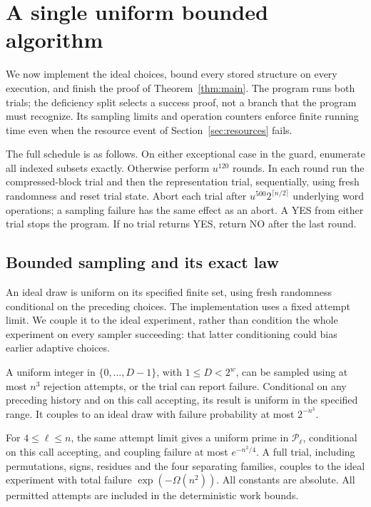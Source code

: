 \section{A single uniform bounded algorithm}
\label{sec:implementation}

We now implement the ideal choices, bound every stored structure on
every execution, and finish the proof of Theorem~\ref{thm:main}.
The program runs both trials; the deficiency split selects a success
proof, not a branch that the program must recognize. Its sampling
limits and operation counters enforce finite running time even when
the resource event of Section~\ref{sec:resources} fails.

The full schedule is as follows. On either exceptional case in the
guard, enumerate all indexed subsets exactly. Otherwise perform
\(u^{120}\) rounds. In each round run the compressed-block trial and
then the representation trial, sequentially, using fresh randomness
and reset trial state. Abort each trial after
\(u^{500}2^{\lceil n/2\rceil}\) underlying word operations; a sampling
failure has the same effect as an abort. A YES from either trial stops
the program. If no trial returns YES, return NO after the last round.

\subsection{Bounded sampling and its exact law}

An ideal draw is uniform on its specified finite set, using fresh
randomness conditional on the preceding choices. The implementation
uses a fixed attempt limit. We couple it to the ideal experiment,
rather than condition the whole experiment on every sampler succeeding:
that latter conditioning could bias earlier adaptive choices.

\begin{lemma}\label{lem:samplers}
A uniform integer in \(\{0,\ldots,D-1\}\), with \(1\le D<2^w\),
can be sampled using at most \(n^3\) rejection attempts, or the trial
can report failure. Conditional on any preceding history and on this
call accepting, its result is uniform in the specified range. It
couples to an ideal draw with failure probability at most
\(2^{-n^3}\).

For \(4\le\ell\le n\), the same attempt limit gives a uniform prime
in \(\mathcal P_\ell\), conditional on this call accepting, and
coupling failure at most \(e^{-n^2/4}\). A full trial, including
permutations, signs, residues and the four separating families, couples
to the ideal experiment with total failure
\(\exp(-\Omega(n^2))\). All constants are absolute. All permitted
attempts are included in the deterministic work bounds.
\end{lemma}

